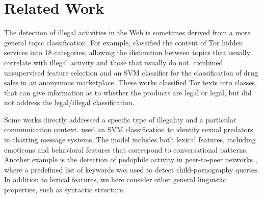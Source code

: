 \documentclass[11pt,a4paper,table]{article}
\newcommand{\oa}[1]{\footnote{\color{red}OA: #1}}
\newcommand{\es}[1]{\footnote{\color{purple}ES: #1}}
\begin{document}
\section{Related Work} \label{sec:related_work}

The detection of illegal activities in the Web is sometimes derived from a more general topic classification. For example, \citet{Biryukov14}
classified the content of Tor hidden services into 18 categories, allowing the distinction between topics that usually correlate with illegal activity and those that usually do not. \citet{GraczykKinningham15} combined unsupervised feature selection and an SVM classifier for the classification of drug sales in an anonymous marketplace.
These works classified Tor texts into classes, that can give information as to whether the products are legal or legal, but did not address the legal/illegal classification.


Some works directly addressed a specific type of illegality and a particular communication context. \citet{MorrisHirst12} used an SVM classification to identify sexual predators in chatting message systems. The model includes both lexical features, including emoticons and behavioral features that correspond to conversational patterns. Another example is the detection of pedophile activity in peer-to-peer networks \citep{Latapy13}, where a predefined list of keywords was used to detect child-pornography queries. In addition to lexical features, we here consider other general linguistic properties, such as syntactic structure.%
\end{document}
